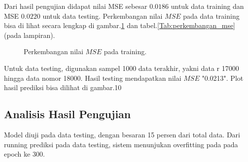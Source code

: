 Dari hasil pengujian didapat nilai MSE sebesar $0.0186$ untuk data training dan MSE $0.0220$ untuk data testing. Perkembangan nilai $MSE$ pada data training bisa di lihat secara lengkap di gambar.\ref{fig:perkembangan_nilai_mse} dan tabel.\ref{Tab:perkembangan_mse} (pada lampiran).

\begin{figure}
  \begin{center}
    \resizebox{\linewidth}{!}{}
  \end{center}
  \caption{Perkembangan nilai $MSE$ pada training.}
  \label{fig:perkembangan_nilai_mse}
\end{figure}

Untuk data testing, digunakan sampel 1000 data terakhir, yakni data r 17000 hingga data nomor 18000. Hasil testing mendapatkan nilai $MSE$ "0.0213". Plot hasil prediksi bisa dilihat di gambar.10

\begin{figure}[h]
  \begin{center}
  \end{center}
  \label{fig:hasil}
\end{figure}

\subsection{Analisis Hasil Pengujian}
Model diuji pada data testing, dengan besaran 15 persen dari total data. Dari running prediksi pada data testing, sistem menunjukan overfitting pada pada epoch ke 300.



